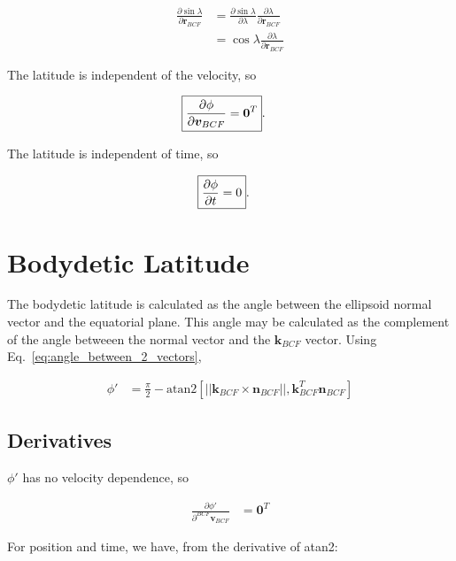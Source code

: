\documentclass[]{article}
\newcommand{\vb}[1]{\bm{#1}} %
\newcommand{\pd}[2]{\frac{\partial #1}{\partial #2}} %
\begin{document}
\begin{align}
	\pd{\sin \lambda}{\vb{r}_{BCF}} &= \pd{\sin \lambda}{\lambda} \pd{\lambda}{\vb{r}_{BCF}} \\
	&= \cos \lambda \pd{\lambda}{\vb{r}_{BCF}}
\end{align}

The latitude is independent of the velocity, so

\begin{align}
\Aboxed{\pd{\phi}{\vb{v}_{BCF}} &= \vb{0}^T}.
\end{align}

The latitude is independent of time, so 

\begin{align}
\Aboxed{\pd{\phi}{t} &= 0}.
\end{align}

\section{Bodydetic Latitude}


The bodydetic latitude is calculated as the angle between the ellipsoid normal vector and the equatorial plane. This angle may be calculated as the complement of the angle betweeen the normal vector and the $\vb{k}_{BCF}$ vector. Using Eq.~\eqref{eq:angle_between_2_vectors},

\begin{align}
	\phi' &= \frac{\pi}{2} - \mathrm{atan2} \left[ || \vb{k}_{BCF} \times \vb{n}_{BCF} ||, \vb{k}_{BCF}^T \vb{n}_{BCF} \right]
\end{align}

\subsection{Derivatives}

$\phi'$ has no velocity dependence, so

\begin{align}
\pd{\phi'}{^{BCF} \vb{v}_{BCF}} &= \vb{0}^T
\end{align}

For position and time, we have, from the derivative of atan2:
\end{document}
